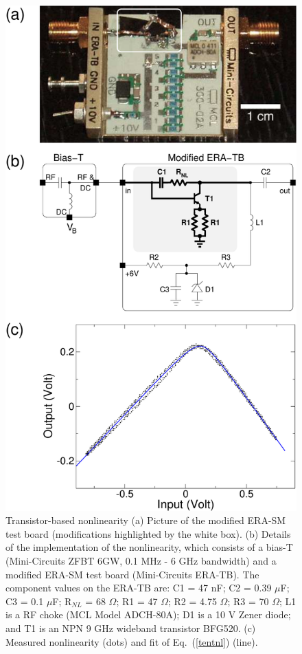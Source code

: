 \documentclass[aps,twocolumn,pre,nofootinbib]{revtex4}
\begin{document}
%
%
% 
\begin{figure}
\includegraphics*[width=\breite \columnwidth]{Fig1} 
\caption{Transistor-based nonlinearity (a)  Picture of the modified ERA-SM test board (modifications highlighted by the white box).  (b) Details of the implementation of the nonlinearity, which consists of a bias-T (Mini-Circuits ZFBT 6GW, 0.1 MHz - 6 GHz bandwidth) and a modified ERA-SM test board (Mini-Circuits ERA-TB). The component values on the ERA-TB are:  C1 = 47 nF; C2 = 0.39 $\mu$F; C3 = 0.1 $\mu$F; R$_{NL}$ = 68 $\Omega$; R1 = 47 $\Omega$;  R2 = 4.75 $\Omega$; R3 = 70 $\Omega$; L1 is a RF choke (MCL Model ADCH-80A); D1 is a 10 V Zener diode; and T1 is an NPN 9 GHz wideband transistor BFG520. (c) Measured nonlinearity (dots) and fit of Eq.~(\ref{tentnl}) (line).
}
\label{fig:nonlinearity}
\end{figure}
 
\end{document}
